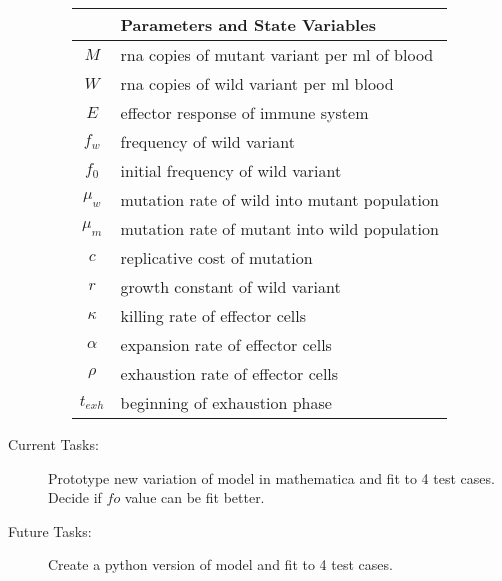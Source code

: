 \documentclass[letterpaper,index=totoc,hyperref,openany]{labbook} %
\begin{document}
\begin{description}
\begin{itemize}
\begin{table}[H]
\centering
\caption{}
\label{my-label}
\begin{tabular}{|l|l|}
\hline
                 & Parameters and State Variables               \\ \hline
$$M$$            & rna copies of mutant variant per ml of blood \\ \hline
$$W$$            & rna copies of wild variant per ml blood      \\ \hline
$$E$$            & effector response of immune system           \\ \hline
$$f_w$$          & frequency of wild variant                    \\ \hline
$$f_0$$          & initial frequency of wild variant            \\ \hline
$$\mu_w$$        & mutation rate of wild into mutant population \\ \hline
$$\mu_m$$        & mutation rate of mutant into wild population \\ \hline
$$c$$            & replicative cost of mutation                 \\ \hline
$$r$$            & growth constant of wild variant              \\ \hline
$$\kappa$$       & killing rate of effector cells               \\ \hline
$$\alpha$$       & expansion rate of effector cells             \\ \hline
$$\rho$$         & exhaustion rate of effector cells            \\ \hline
$$t_{exh}$$      & beginning of exhaustion phase                \\ \hline
\end{tabular}
\end{table}
    
    \end{itemize}
  \item[Current Tasks:]{ Prototype new variation of model in mathematica and fit to 4 test cases. Decide if $fo$ value can be fit better.}
  \item[Future Tasks:] {Create a python version of model and fit to 4 test cases.}
  \end{description}
\end{document}
